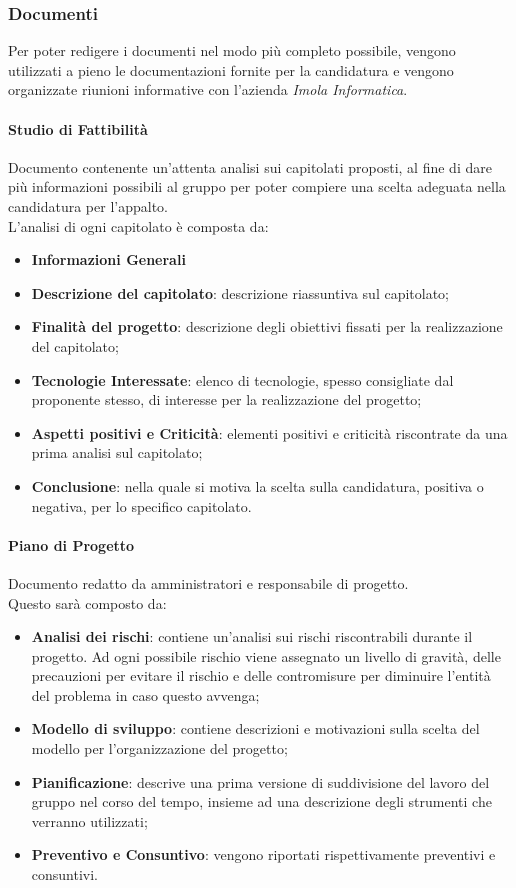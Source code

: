 	\subsubsection{Documenti}
	Per poter redigere i documenti nel modo più completo possibile, vengono utilizzati a pieno le documentazioni fornite per la candidatura e vengono organizzate riunioni informative con l'azienda  \textit{Imola Informatica}.
		
		\paragraph{Studio di Fattibilità}  \hfill \break
	 	Documento contenente un'attenta analisi sui capitolati proposti, al fine di dare più informazioni possibili al gruppo per poter compiere una scelta adeguata nella candidatura per l'appalto. \\
	 	L'analisi di ogni capitolato è composta da:
	 	\begin{itemize}
	 		\item \textbf{Informazioni Generali}
	 		\item \textbf{Descrizione del capitolato}: descrizione riassuntiva sul capitolato;
			\item \textbf{Finalità del progetto}: descrizione degli obiettivi fissati per la realizzazione del capitolato;
 			\item \textbf{Tecnologie Interessate}: elenco di tecnologie, spesso consigliate dal proponente stesso, di interesse per la realizzazione del progetto;
	 		\item \textbf{Aspetti positivi e Criticità}: elementi positivi e criticità riscontrate da una prima analisi sul capitolato;
	 		\item \textbf{Conclusione}: nella quale si motiva la scelta sulla candidatura, positiva o negativa, per lo specifico capitolato.
		\end{itemize} 
 		
		\paragraph{Piano di Progetto}  \hfill \break
		Documento redatto da amministratori e responsabile di progetto. \\
    Questo sarà composto da:
		\begin{itemize}
			\item \textbf{Analisi dei rischi}: contiene un'analisi sui rischi riscontrabili durante il progetto. Ad ogni possibile rischio viene assegnato un livello di gravità, delle precauzioni per evitare il rischio e delle contromisure per diminuire l'entità del problema in caso questo avvenga; 
			\item \textbf{Modello di sviluppo}: contiene descrizioni e motivazioni sulla scelta del modello per l'organizzazione del progetto;
			\item \textbf{Pianificazione}: descrive una prima versione di suddivisione del lavoro del gruppo nel corso del tempo, insieme ad una descrizione degli strumenti che verranno utilizzati;
			\item \textbf{Preventivo e Consuntivo}: vengono riportati rispettivamente preventivi e consuntivi.
		\end{itemize}
	
